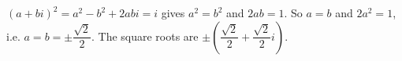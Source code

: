 $(a+bi)^2=a^2-b^2+2abi=i$ gives $a^2=b^2$ and $2ab=1$. So $a=b$ and $2a^2=1$, i.e. $a=b=\pm\dfrac{\sqrt2}{2}$. The square roots are $\boxed{\pm\left(\dfrac{\sqrt2}{2}+\dfrac{\sqrt2}{2}i\right)}$.
